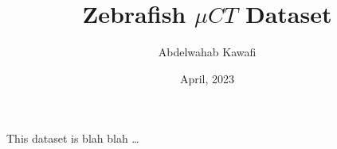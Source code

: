 \documentclass[12pt, a4paper, ]{report}
\begin{document}
\title{\huge{\textbf{Zebrafish $\mu CT$ Dataset}}}
\author{Abdelwahab Kawafi}
\date{April, 2023}

\maketitle

This dataset is blah blah \dots


\newpage
\end{document}
